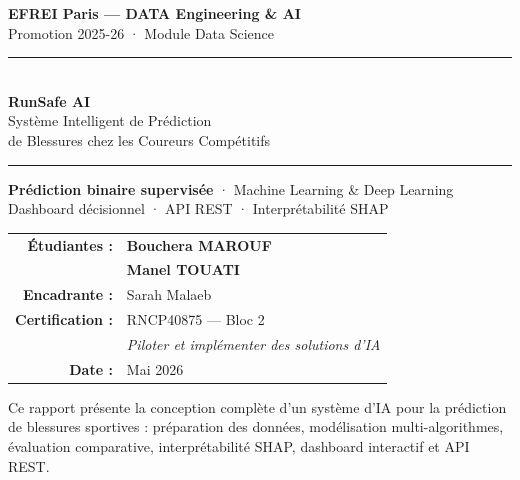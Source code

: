 \documentclass[12pt,a4paper]{report}
\begin{document}
\onehalfspacing

\begin{titlepage}
\begin{center}

\vspace*{1cm}
{\large\textbf{EFREI Paris — DATA Engineering \& AI}}\\[0.3cm]
{\normalsize Promotion 2025-26 · Module Data Science}\\[0.5cm]
\rule{\textwidth}{1.5pt}\\[0.4cm]

\vspace{0.5cm}
{\color{primary}\Huge\bfseries RunSafe AI}\\[0.4cm]
{\color{darktext}\LARGE Système Intelligent de Prédiction}\\[0.2cm]
{\color{darktext}\LARGE de Blessures chez les Coureurs Compétitifs}\\[0.4cm]
\rule{\textwidth}{1.5pt}

\vspace{1cm}
\begin{tcolorbox}[colback=lightgray, colframe=primary, boxrule=1pt, arc=6pt]
\centering
\textbf{Prédiction binaire supervisée} · Machine Learning \& Deep Learning \\
Dashboard décisionnel · API REST · Interprétabilité SHAP
\end{tcolorbox}

\vspace{1.5cm}
\begin{tabular}{rl}
\textbf{Étudiantes :} & \textbf{Bouchera MAROUF} \\
                       & \textbf{Manel TOUATI} \\[0.4cm]
\textbf{Encadrante :} & Sarah Malaeb \\[0.4cm]
\textbf{Certification :} & RNCP40875 — Bloc 2 \\
                          & \textit{Piloter et implémenter des solutions d'IA} \\[0.4cm]
\textbf{Date :} & Mai 2026 \\
\end{tabular}

\vspace{2cm}
{\small\textcolor{mutedtext}{Ce rapport présente la conception complète d'un système d'IA pour la
prédiction de blessures sportives : préparation des données, modélisation multi-algorithmes,
évaluation comparative, interprétabilité SHAP, dashboard interactif et API REST.}}

\end{center}
\end{titlepage}
\end{document}
